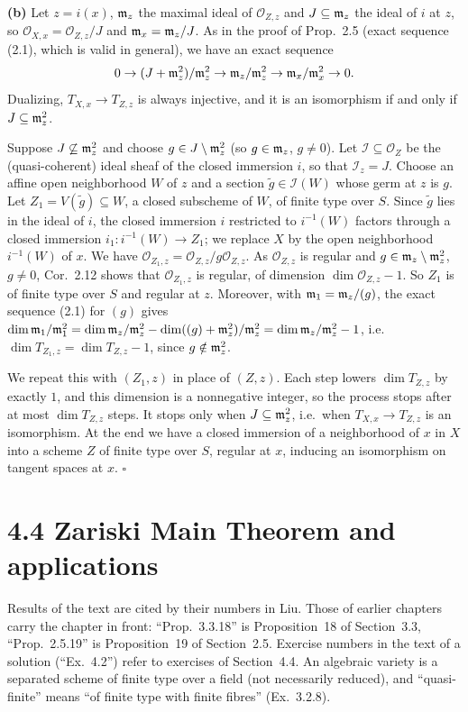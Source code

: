 \documentclass[11pt]{article}
\begin{document}
\textbf{(b)} Let $z=i(x)$, $\mathfrak m_z$ the maximal ideal of $\mathcal O_{Z,z}$ and $J\subseteq\mathfrak m_z$ the ideal of $i$ at $z$, so $\mathcal O_{X,x}=\mathcal O_{Z,z}/J$ and $\mathfrak m_x=\mathfrak m_z/J$. As in the proof of Prop.~2.5 (exact sequence (2.1), which is valid in general), we have an exact sequence
\[ 0\to(J+\mathfrak m_z^2)/\mathfrak m_z^2\to\mathfrak m_z/\mathfrak m_z^2\to\mathfrak m_x/\mathfrak m_x^2\to0. \]
Dualizing, $T_{X,x}\to T_{Z,z}$ is always injective, and it is an isomorphism if and only if $J\subseteq\mathfrak m_z^2$.

Suppose $J\not\subseteq\mathfrak m_z^2$ and choose $g\in J\setminus\mathfrak m_z^2$ (so $g\in\mathfrak m_z$, $g\neq0$). Let $\mathcal I\subseteq\mathcal O_Z$ be the (quasi-coherent) ideal sheaf of the closed immersion $i$, so that $\mathcal I_z=J$. Choose an affine open neighborhood $W$ of $z$ and a section $\tilde g\in\mathcal I(W)$ whose germ at $z$ is $g$. Let $Z_1=V(\tilde g)\subseteq W$, a closed subscheme of $W$, of finite type over $S$. Since $\tilde g$ lies in the ideal of $i$, the closed immersion $i$ restricted to $i^{-1}(W)$ factors through a closed immersion $i_1:i^{-1}(W)\to Z_1$; we replace $X$ by the open neighborhood $i^{-1}(W)$ of $x$. We have $\mathcal O_{Z_1,z}=\mathcal O_{Z,z}/g\mathcal O_{Z,z}$. As $\mathcal O_{Z,z}$ is regular and $g\in\mathfrak m_z\setminus\mathfrak m_z^2$, $g\neq0$, Cor.~2.12 shows that $\mathcal O_{Z_1,z}$ is regular, of dimension $\dim\mathcal O_{Z,z}-1$. So $Z_1$ is of finite type over $S$ and regular at $z$. Moreover, with $\mathfrak m_1=\mathfrak m_z/(g)$, the exact sequence (2.1) for $(g)$ gives $\dim\mathfrak m_1/\mathfrak m_1^2=\dim\mathfrak m_z/\mathfrak m_z^2-\dim((g)+\mathfrak m_z^2)/\mathfrak m_z^2=\dim\mathfrak m_z/\mathfrak m_z^2-1$, i.e.\ $\dim T_{Z_1,z}=\dim T_{Z,z}-1$, since $g\notin\mathfrak m_z^2$.

We repeat this with $(Z_1,z)$ in place of $(Z,z)$. Each step lowers $\dim T_{Z,z}$ by exactly $1$, and this dimension is a nonnegative integer, so the process stops after at most $\dim T_{Z,z}$ steps. It stops only when $J\subseteq\mathfrak m_z^2$, i.e.\ when $T_{X,x}\to T_{Z,z}$ is an isomorphism. At the end we have a closed immersion of a neighborhood of $x$ in $X$ into a scheme $Z$ of finite type over $S$, regular at $x$, inducing an isomorphism on tangent spaces at $x$. \hfill$\square$

\section*{4.4 Zariski Main Theorem and applications}

Results of the text are cited by their numbers in Liu. Those of earlier chapters carry the chapter in front: ``Prop.~3.3.18'' is Proposition~18 of Section~3.3, ``Prop.~2.5.19'' is Proposition~19 of Section~2.5. Exercise numbers in the text of a solution (``Ex.~4.2'') refer to exercises of Section~4.4. An algebraic variety is a separated scheme of finite type over a field (not necessarily reduced), and ``quasi-finite'' means ``of finite type with finite fibres'' (Ex.~3.2.8).
\end{document}

